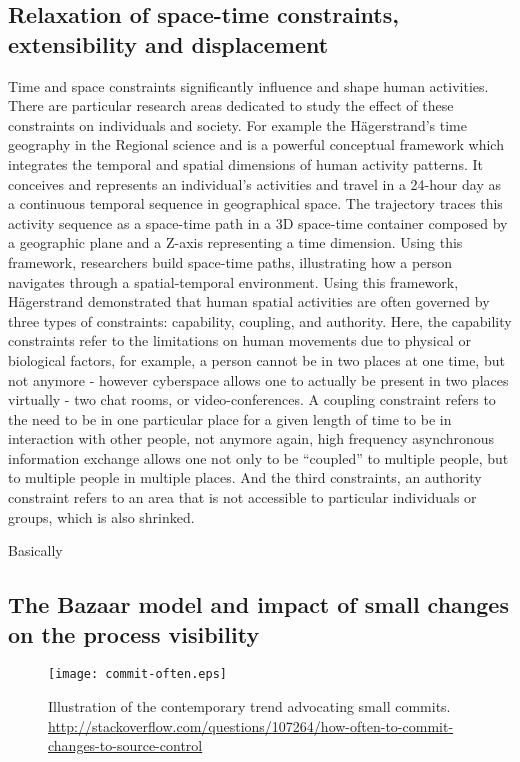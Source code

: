 \subsection{Relaxation of space-time constraints, extensibility and displacement}
Time and space constraints significantly influence and shape human activities. There are 
particular research areas dedicated to study the effect of these constraints on individuals 
and society. For example the Hägerstrand's time geography in the Regional science and is 
a powerful conceptual framework which integrates the temporal and spatial dimensions of
human activity patterns. It conceives and represents an individual’s activities and travel 
in a 24-hour day as a continuous temporal sequence in geographical space. The trajectory 
traces this activity sequence as a space-time path in a 3D space-time container composed by a
geographic plane and a Z-axis representing a time dimension. Using this framework, researchers
build space-time paths, illustrating how a person navigates through a spatial-temporal environment.
Using this framework, Hägerstrand demonstrated that human spatial activities are often governed by
three types of constraints: capability, coupling, and authority. Here, the capability constraints
refer to the limitations on human movements due to physical or biological factors, for
example, a person cannot be in two places at one time, but not anymore - however cyberspace allows 
one to actually be present in two places virtually - two chat rooms, or video-conferences.
A coupling constraint refers to the need to be in one particular place for a given length of time 
to be in interaction with other people, not anymore again, high frequency asynchronous
information exchange allows one not only to be ``coupled'' to multiple people, but to multiple 
people in multiple places. And the third constraints, an authority constraint refers to an 
area that is not accessible to particular individuals or groups, which is also shrinked.

Basically

\subsection{The Bazaar model and impact of small changes on the process visibility}
\begin{figure}[tbp]
   \centering
   \texttt{[image: commit-often.eps]}
   \caption{Illustration of the contemporary trend advocating small commits. 
\url{http://stackoverflow.com/questions/107264/how-often-to-commit-changes-to-source-control}}
   \label{fig:commit-often}
\end{figure}

